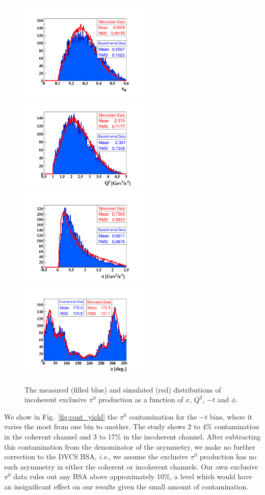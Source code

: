 \documentclass[aps,prc,preprint,superscriptaddress]{revtex4}
\begin{document}
\begin{figure}[p]
\center
\includegraphics[trim=70 15 70 70,clip,width=6.3cm]{xB_InCoh_pi0.png}
\includegraphics[trim=70 15 70 70,clip,width=6.3cm]{Q2_InCoh_pi0.png}
\includegraphics[trim=70 15 70 70,clip,width=6.3cm]{t_InCoh_pi0.png}
\includegraphics[trim=70 15 70 70,clip,width=6.3cm]{phi_h_InCoh_pi0.png}
	\caption{The measured (filled blue) and simulated (red) distributions of
	incoherent exclusive $\pi^0$ production as a function of $x$, $Q^2$, $-t$ and $\phi$.}
\label{fig:InCohPi0Simul}
\end{figure}


We show in Fig.~\ref{fig:cont_yield} the $\pi^0$ contamination for the $-t$ 
bins, where it varies the most from one bin to another. The study shows 2 to 
4\% contamination in the coherent channel and 3 to 17\% in the incoherent 
channel. After subtracting this contamination from the denominator of the 
asymmetry, we make no further correction to 
the DVCS BSA, \textit{i.e}., we assume the exclusive $\pi^0$ production has no such 
asymmetry in either the coherent or incoherent channels. Our own exclusive $\pi^0$ 
data rules out any BSA above approximately 10\%, a level which would have an 
insignificant effect on our results given the small amount of contamination.
\end{document}
